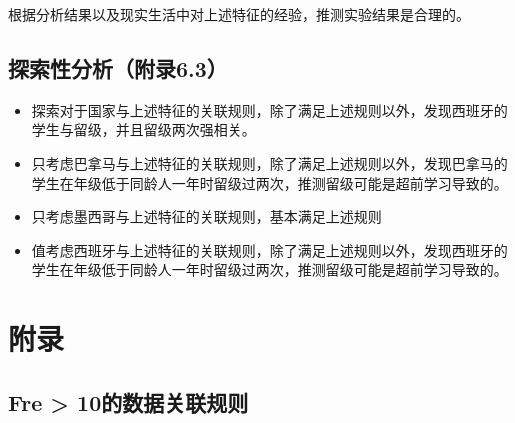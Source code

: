 \documentclass[12pt, a4paper, oneside]{ctexart}
\begin{document}
根据分析结果以及现实生活中对上述特征的经验，推测实验结果是合理的。


\subsection{探索性分析（附录6.3）}
\begin{itemize}
    \item 探索对于国家与上述特征的关联规则，除了满足上述规则以外，发现西班牙的学生与留级，并且留级两次强相关。
    \item 只考虑巴拿马与上述特征的关联规则，除了满足上述规则以外，发现巴拿马的学生在年级低于同龄人一年时留级过两次，推测留级可能是超前学习导致的。
    \item 只考虑墨西哥与上述特征的关联规则，基本满足上述规则
    \item 值考虑西班牙与上述特征的关联规则，除了满足上述规则以外，发现西班牙的学生在年级低于同龄人一年时留级过两次，推测留级可能是超前学习导致的。
\end{itemize}







\clearpage
\section{附录}
\subsection{Fre > 10的数据关联规则}
\end{document}
